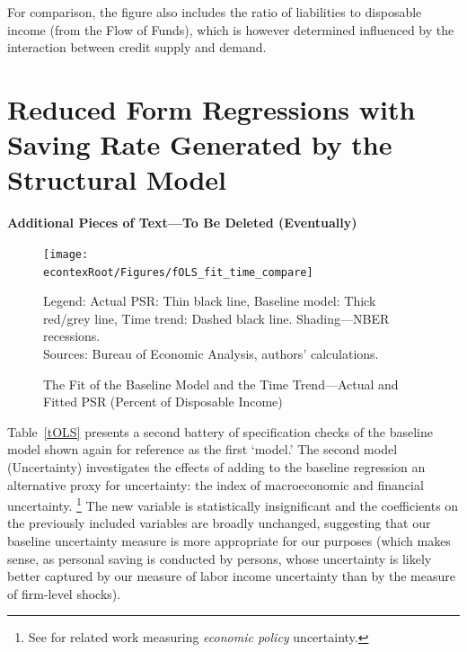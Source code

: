\documentclass[titlepage]{\econtex}
\newcommand{\jbemph}[1]{{\textbf{\color{jirkasblue}#1}}}
\begin{document}
For comparison, the figure also includes the ratio of liabilities to disposable income (from the Flow of Funds), which is however determined influenced by the interaction between credit supply and demand.

\clearpage

\section{Reduced Form Regressions with Saving Rate Generated by the Structural Model}












\clearpage
\jbemph{Additional Pieces of Text---To Be Deleted (Eventually)}

\hypertarget{fOLS-fit-time-compare}{}
\begin{figure}
\caption{The Fit of the Baseline Model and the Time Trend---Actual and Fitted PSR (Percent of Disposable Income)}
\label{fOLS_fit_time_compare}
\texttt{[image: \\econtexRoot/Figures/fOLS\_fit\_time\_compare]}

\footnotesize
Legend: Actual PSR: Thin black line, Baseline model: Thick red/grey line, Time trend: Dashed black line. Shading---NBER recessions.\\[0mm]
\tiny Sources: Bureau of Economic Analysis, authors' calculations.
\end{figure}



Table~\ref{tOLS} presents a second battery of specification checks of
the baseline model shown again for reference as the first `model.'  The second model (Uncertainty) investigates the effects of adding to the baseline regression an
alternative proxy for uncertainty: the
\cite{bfjstUncertain} index of macroeconomic and
financial uncertainty.%
\footnote{See \cite{baker_policyUncertainty} for related work measuring \emph{economic policy} uncertainty.
}
 The new variable is statistically insignificant
and the coefficients on the previously included variables are broadly
unchanged, suggesting that our baseline uncertainty measure is more
appropriate for our purposes (which makes sense, as personal saving is
conducted by persons, whose uncertainty is likely better captured by
our measure of labor income uncertainty than by the
\cite{bfjstUncertain} measure of firm-level shocks).
\end{document}

